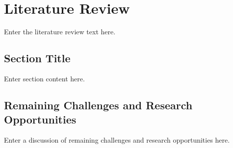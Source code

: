 
\newpage



\chapter{Literature Review}
\label{chap:literature}

Enter the literature review text here.

\section{Section Title}

Enter section content here.

\section{Remaining Challenges and Research Opportunities}

Enter a discussion of remaining challenges and research opportunities here.
